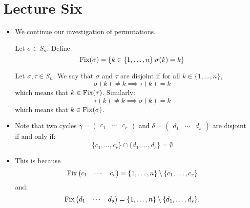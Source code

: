 \section{Lecture Six}
\begin{itemize}
    \item We continue our investigation of permutations.
    \begin{definition}
        Let $\sigma \in S_n$. Define:
        \begin{equation}
            \operatorname{Fix}(\sigma)=\{k\in\{1,\dots,n\}|\sigma(k)=k\}
        \end{equation}
    \end{definition}
    \begin{definition}
        Let $\sigma, \tau \in S_n$. We say that $\sigma$ and $\tau$ are disjoint if for all $k\in \{1,\dots,n\}$,
        \begin{equation}
            \sigma(k) \neq k \implies \tau(k) = k
        \end{equation}
        which means that $k\in \operatorname{Fix}(\tau)$. Similarly:
        \begin{equation}
            \tau(k)\neq k \implies \sigma(k) = k
        \end{equation}
        which means that $k \in \operatorname{Fix}(\sigma)$.
    \end{definition}
    \item Note that two cycles $\gamma=\begin{pmatrix}
        c_1 & \cdots & c_r
    \end{pmatrix}$ and $\delta = \begin{pmatrix}
        d_1 & \cdots & d_s
    \end{pmatrix}$ are disjoint if and only if:
    \begin{equation}
        \{c_1,\dots,c_r\} \cap \{d_1,\dots,d_s\} = \emptyset
    \end{equation}
    \item This is because
    \begin{equation}
        \operatorname{Fix} \begin{pmatrix}
            c_1 & \cdots & c_r
        \end{pmatrix} = \{1,\dots,n\} \setminus \{c_1,\dots,c_r\}
    \end{equation}
    and:
    \begin{equation}
        \fix \begin{pmatrix}
            d_1 & \cdots & d_s
        \end{pmatrix} = \{1,\dots, n\} \setminus \{d_1,\dots,d_s\}.

\end{equation}
\end{itemize}
